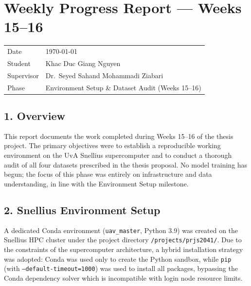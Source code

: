 
\section*{Weekly Progress Report — Weeks 15--16}

\begin{tabular}{ll}
    Date      & \today \\
    Student   & Khac Duc Giang Nguyen \\
    Supervisor & Dr.\ Seyed Sahand Mohammadi Ziabari \\
    Phase     & Environment Setup \& Dataset Audit (Weeks 15--16) \\
\end{tabular}

\vspace{1em}

\subsection*{1. Overview}

This report documents the work completed during Weeks 15--16 of the
thesis project. The primary objectives were to establish a reproducible
working environment on the UvA Snellius supercomputer and to conduct a
thorough audit of all four datasets prescribed in the thesis proposal.
No model training has begun; the focus of this phase was entirely on
infrastructure and data understanding, in line with the Environment Setup milestone.

\subsection*{2. Snellius Environment Setup}

A dedicated Conda environment (\texttt{uav\_master}, Python 3.9) was
created on the Snellius HPC cluster under the project directory
\texttt{/projects/prjs2041/}. Due to the constraints of the
supercomputer architecture, a hybrid installation strategy was adopted:
Conda was used only to create the Python sandbox, while \texttt{pip}
(with \texttt{--default-timeout=1000}) was used to install all packages,
bypassing the Conda dependency solver which is incompatible with login
node resource limits.

